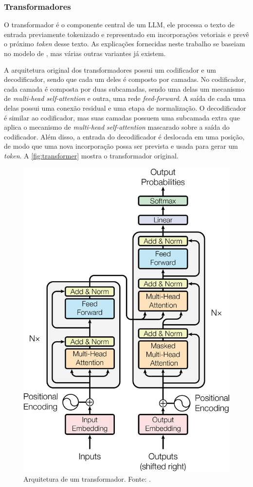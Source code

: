 \subsubsection{Transformadores} \label{sec:transformers}

O transformador é o componente central de um \ac{LLM}, ele processa o texto de entrada previamente tokenizado e representado em incorporações vetoriais e prevê o
próximo \textit{token} desse texto. As explicações fornecidas neste trabalho se baseiam no modelo de \textcite{transformer}, mas várias outras variantes já existem.

A arquitetura original dos transformadores possui um codificador e um decodificador, sendo que cada um deles é composto por camadas. No codificador, cada camada é
composta por duas subcamadas, sendo uma delas um mecanismo de \textit{multi-head self-attention} e outra, uma rede \textit{feed-forward}. A saída de cada uma delas possui
uma conexão residual e uma etapa de normalização. O decodificador é similar ao codificador, mas suas camadas possuem uma subcamada extra que aplica o mecanismo de
\textit{multi-head self-attention} mascarado sobre a saída do codificador. Além disso, a entrada do decodificador é deslocada em uma posição, de modo que uma nova
incorporação possa ser prevista e usada para gerar um \textit{token}. A \autoref{fig:transformer} mostra o transformador original.

\begin{figure}[ht]
      \centering
      \includegraphics[width=0.4\columnwidth,keepaspectratio]{images/transformer.png}
      \caption{Arquitetura de um transformador. Fonte: \textcite{transformer}.}
      \label{fig:transformer}
\end{figure}

